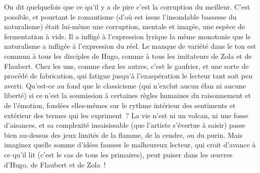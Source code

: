 \documentclass[french,twoside]{book} %
\begin{document}
On dit quelquefois que ce qu’il y a de pire c’est la corruption du meilleur. C’est possible, et pourtant le romantisme (d’où est issue l’insondable bassesse du naturalisme) était lui-même une corruption, mentale et imagée, une espèce de fermentation à vide. Il a infligé à l’expression lyrique la même monotonie que le naturalisme a infligée à l’expression du réel. Le manque de variété dans le ton est commun à tous les disciples de Hugo, comme à tous les imitateurs de Zola et de Flaubert. Chez les uns, comme chez les autres, c’est le gaufrier, et une sorte de procédé de fabrication, qui fatigue jusqu’à l’exaspération le lecteur tant soit peu averti. Qu’est-ce au fond que le classicisme (qui n’exclut aucun élan ni aucune liberté) si ce n’est la soumission à certaines règles humaines du raisonnement et de l’émotion, fondées elles-mêmes sur le rythme intérieur des sentiments et extérieur des termes qui les expriment ? La vie n’est ni un volcan, ni une fosse d’aisances, et sa complexité insaisissable (que l’artiste s’évertue à saisir) passe bien au-dessus des jeux limités de la flamme, de la cendre, ou du purin. Mais imaginez quelle somme d’idées fausses le malheureux lecteur, qui croit d’avance à ce qu’il lit (c’est le cas de tous les primaires), peut puiser dans les œuvres d’Hugo, de Flaubert et de Zola !\par
\end{document}
